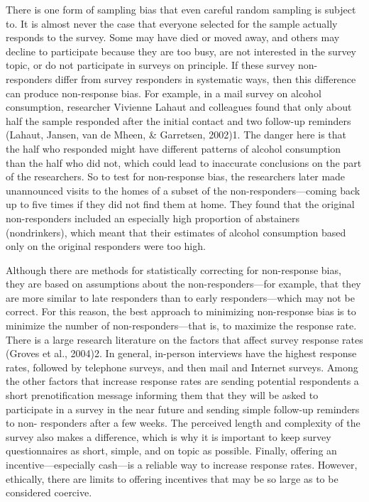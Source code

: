 There is one form of sampling bias that even careful random sampling is subject to. It is almost never the case that everyone selected for the sample actually responds to the survey. Some may have died or moved away, and others may decline to participate because they are too busy, are not interested in the survey topic, or do not participate in surveys on principle. If these survey non-responders differ from survey responders in systematic ways, then this difference can produce non-response bias. For example, in a mail survey on alcohol consumption, researcher Vivienne Lahaut and colleagues found that only about half the sample responded after the initial contact and two follow-up reminders (Lahaut, Jansen, van de Mheen, \& Garretsen, 2002)1. The danger here is that the half who responded might have different patterns of alcohol consumption than the half who did not, which could lead to inaccurate conclusions on the part of the researchers. So to test for non-response bias, the researchers later made unannounced visits to the homes of a subset of the non-responders---coming back up to five times if they did not find them at home. They found that the original non-responders included an especially high proportion of abstainers (nondrinkers), which meant that their estimates of alcohol consumption based only on the original responders were too high.

Although there are methods for statistically correcting for non-response bias, they are based on assumptions about the non-responders---for example, that they are more similar to late responders than to early responders---which may not be correct. For this reason, the best approach to minimizing non-response bias is to minimize the number of non-responders---that is, to maximize the response rate. There is a large research literature on the factors that affect survey response rates (Groves et al., 2004)2. In general, in-person interviews have the highest response rates, followed by telephone surveys, and then mail and Internet surveys. Among the other factors that increase response rates are sending potential respondents a short prenotification message informing them that they will be asked to participate in a survey in the near future and sending simple follow-up reminders to non- responders after a few weeks. The perceived length and complexity of the survey also makes a difference, which is why it is important to keep survey questionnaires as short, simple, and on topic as possible. Finally, offering an incentive---especially cash---is a reliable way to increase response rates. However, ethically, there are limits to offering incentives that may be so large as to be considered coercive.

